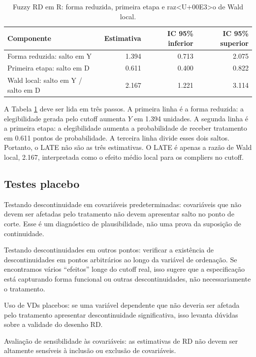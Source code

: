 \documentclass[
]{article}
\begin{document}
\begin{table}

\caption{\label{tab:tabela-fuzzy-rd-r}Fuzzy RD em R: forma reduzida, primeira etapa e raz<U+00E3>o de Wald local.}
\centering
\begin{tabular}[t]{l|r|r|r}
\hline
Componente & Estimativa & IC 95\% inferior & IC 95\% superior\\
\hline
Forma reduzida: salto em Y & 1.394 & 0.713 & 2.075\\
\hline
Primeira etapa: salto em D & 0.611 & 0.400 & 0.822\\
\hline
Wald local: salto em Y / salto em D & 2.167 & 1.221 & 3.114\\
\hline
\end{tabular}
\end{table}

A Tabela \ref{tab:tabela-fuzzy-rd-r} deve ser lida em três passos. A primeira linha é a forma reduzida: a elegibilidade gerada pelo cutoff aumenta \(Y\) em 1.394 unidades. A segunda linha é a primeira etapa: a elegibilidade aumenta a probabilidade de receber tratamento em 0.611 pontos de probabilidade. A terceira linha divide esses dois saltos. Portanto, o LATE não são as três estimativas. O LATE é apenas a razão de Wald local, 2.167, interpretada como o efeito médio local para os compliers no cutoff.

\subsection{Testes placebo}\label{testes-placebo}

Testando descontinuidade em covariáveis predeterminadas: covariáveis que não devem ser afetadas pelo tratamento não devem apresentar salto no ponto de corte. Esse é um diagnóstico de plausibilidade, não uma prova da suposição de continuidade.

Testando descontinuidades em outros pontos: verificar a existência de descontinuidades em pontos arbitrários ao longo da variável de ordenação. Se encontramos vários ``efeitos'' longe do cutoff real, isso sugere que a especificação está capturando forma funcional ou outras descontinuidades, não necessariamente o tratamento.

Uso de VDs placebos: se uma variável dependente que não deveria ser afetada pelo tratamento apresentar descontinuidade significativa, isso levanta dúvidas sobre a validade do desenho RD.

Avaliação de sensibilidade às covariáveis: as estimativas de RD não devem ser altamente sensíveis à inclusão ou exclusão de covariáveis.
\end{document}
